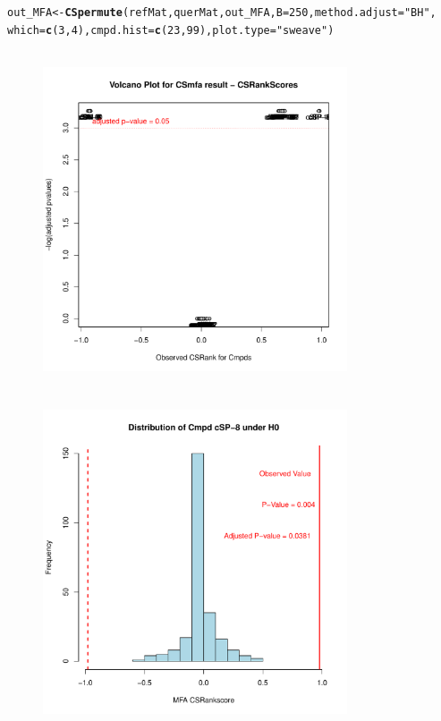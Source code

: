 \documentclass[a4paper]{article}\usepackage[]{graphicx}\usepackage[]{color}
\makeatletter
\newcommand{\hlnum}[1]{\textcolor[rgb]{0.686,0.059,0.569}{#1}}%
\newcommand{\hlstr}[1]{\textcolor[rgb]{0.192,0.494,0.8}{#1}}%
\newcommand{\hlstd}[1]{\textcolor[rgb]{0.345,0.345,0.345}{#1}}%
\newcommand{\hlkwb}[1]{\textcolor[rgb]{0.69,0.353,0.396}{#1}}%
\newcommand{\hlkwc}[1]{\textcolor[rgb]{0.333,0.667,0.333}{#1}}%
\newcommand{\hlkwd}[1]{\textcolor[rgb]{0.737,0.353,0.396}{\textbf{#1}}}%
\newenvironment{kframe}{%
 \def\at@end@of@kframe{}%
 \ifinner\ifhmode%
  \def\at@end@of@kframe{\end{minipage}}%
  \begin{minipage}{\columnwidth}%
 \fi\fi%
 \def\FrameCommand##1{\hskip\@totalleftmargin \hskip-\fboxsep
 \colorbox{shadecolor}{##1}\hskip-\fboxsep
     \hskip-\linewidth \hskip-\@totalleftmargin \hskip\columnwidth}%
 \MakeFramed {\advance\hsize-\width
   \@totalleftmargin\z@ \linewidth\hsize
   \@setminipage}}%
 {\par\unskip\endMakeFramed%
 \at@end@of@kframe}
\newenvironment{knitrout}{}{} %
\makeatother
\begin{document}
\begin{knitrout}
\color{fgcolor}\begin{kframe}
\begin{alltt}
\hlstd{out_MFA} \hlkwb{<-} \hlkwd{CSpermute}\hlstd{(refMat,querMat,out_MFA,}\hlkwc{B}\hlstd{=}\hlnum{250}\hlstd{,}\hlkwc{method.adjust}\hlstd{=}\hlstr{"BH"}\hlstd{,}
                \hlkwc{which}\hlstd{=}\hlkwd{c}\hlstd{(}\hlnum{3}\hlstd{,}\hlnum{4}\hlstd{),}\hlkwc{cmpd.hist}\hlstd{=}\hlkwd{c}\hlstd{(}\hlnum{23}\hlstd{,}\hlnum{99}\hlstd{),}\hlkwc{plot.type}\hlstd{=}\hlstr{"sweave"}\hlstd{)}
\end{alltt}
\end{kframe}\begin{figure}[H]

\includegraphics[width=9cm,height=10cm]{figure/CSpermuteplots2-1} 
\includegraphics[width=9cm,height=10cm]{figure/CSpermuteplots2-2} 

\end{figure}
\end{knitrout}
\end{document}
